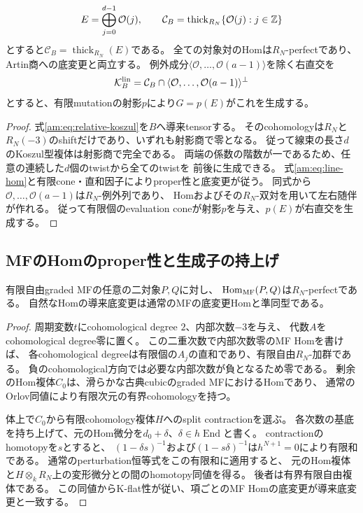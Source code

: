 \begin{lemma}[線束生成部分の有限模型]\label{am:lem:linear-category}
\[
 E=\bigoplus_{j=0}^{d-1}\mathcal O(j),\qquad
 \mathcal C_B=\operatorname{thick}_{R_N}\{\mathcal O(j):j\in\mathbb Z\}
\]
とすると$\mathcal C_B=\operatorname{thick}_{R_N}(E)$である。
全ての対象対のHomは$R_N$-perfectであり、Artin商への底変更と両立する。
例外成分$\langle\mathcal O,\ldots,\mathcal O(a-1)\rangle$を除く右直交を
\[
 \mathcal K_B^{\rm lin}
 =\mathcal C_B\cap\langle\mathcal O,\ldots,\mathcal O(a-1)\rangle^\perp
\]
とすると、有限mutationの射影$p$により$G=p(E)$がこれを生成する。
\end{lemma}

\begin{proof}
式\eqref{am:eq:relative-koszul}を$B$へ導来tensorする。
そのcohomologyは$R_N$と$R_N(-3)$のshiftだけであり、いずれも射影商で零となる。
従って線束の長さ$d$のKoszul型複体は射影商で完全である。
両端の係数の階数が一であるため、任意の連続した$d$個のtwistから全てのtwistを
前後に生成できる。
式\eqref{am:eq:line-hom}と有限cone・直和因子によりproper性と底変更が従う。
同式から$\mathcal O,\ldots,\mathcal O(a-1)$は$R_N$-例外列であり、
Homおよびその$R_N$-双対を用いて左右随伴が作れる。
従って有限個のevaluation coneが射影$p$を与え、$p(E)$が右直交を生成する。
\end{proof}

\subsection{MFのHomのproper性と生成子の持上げ}

\begin{lemma}\label{am:lem:mf-hom}
有限自由graded MFの任意の二対象$P,Q$に対し、
$\operatorname{Hom}_{\operatorname{MF}}(P,Q)$は$R_N$-perfectである。
自然なHomの導来底変更は通常のMFの底変更Homと準同型である。
\end{lemma}

\begin{proof}
周期変数$t$にcohomological degree $2$、内部次数$-3$を与え、
代数$A$をcohomological degree零に置く。
この二重次数で内部次数零のMF Homを書けば、
各cohomological degreeは有限個の$A_j$の直和であり、有限自由$R_N$-加群である。
負のcohomological方向では必要な内部次数が負となるため零である。
剰余のHom複体$C_0$は、滑らかな古典cubicのgraded MFにおけるHomであり、
通常のOrlov同値により有限次元の有界cohomologyを持つ。

体上で$C_0$から有限cohomology複体$H$へのsplit contractionを選ぶ。
各次数の基底を持ち上げて、元のHom微分を$d_0+\delta$、$\delta\in h\operatorname{End}$と書く。
contractionのhomotopyを$s$とすると、
$(1-\delta s)^{-1}$および$(1-s\delta)^{-1}$は$h^{N+1}=0$により有限和である。
通常のperturbation恒等式をこの有限和に適用すると、
元のHom複体と$H\otimes_kR_N$上の変形微分との間のhomotopy同値を得る。
後者は有界有限自由複体である。
この同値からK-flat性が従い、項ごとのMF Homの底変更が導来底変更と一致する。
\end{proof}

